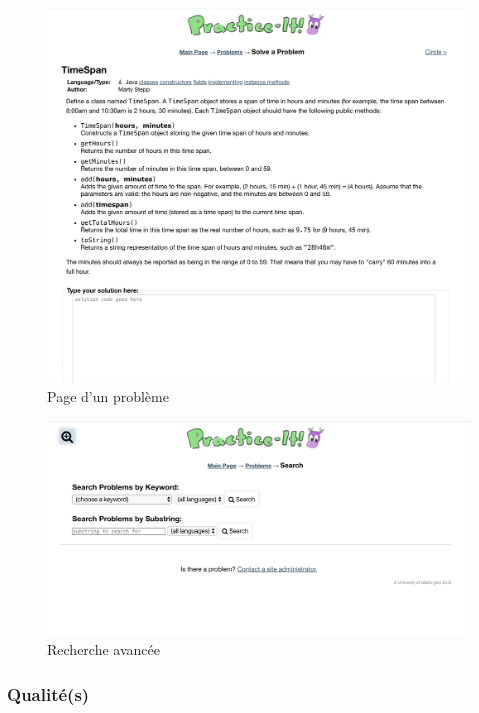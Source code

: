 \begin{figure}[H]
    \includegraphics[width=\textwidth,height=0.35\textheight,keepaspectratio]{images/comparison/practice-it-2.png}
    \centering
    \caption[Practice-it : page d'un problème]{Page d'un problème}
\end{figure}

\begin{figure}[H]
    \includegraphics[width=\textwidth,height=0.35\textheight,keepaspectratio]{images/comparison/practice-it-3.png}
    \centering
    \caption[Practice-it : recherche avancée]{Recherche avancée}
\end{figure}

\subsubsection*{Qualité(s)}


